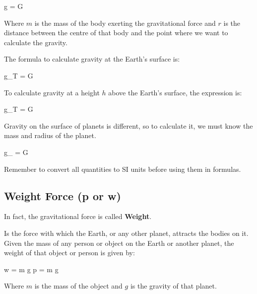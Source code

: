\begin{centeredequation}
    g = G \cdot {}
\end{centeredequation}

Where \( m \) is the mass of the body exerting the gravitational force and \( r \) is the distance between the centre of that body and the point where we want to calculate the gravity.

The formula to calculate gravity at the Earth's surface is:

\begin{centeredequation}
    g_T = G \cdot {}
\end{centeredequation}

To calculate gravity at a height \( h \) above the Earth's surface, the expression is:

\begin{centeredequation}
    g_T = G \cdot {}
\end{centeredequation}

\begin{remark}
    Gravity on the surface of planets is different, so to calculate it, we must know the mass and radius of the planet.
\end{remark}

\newpage

\begin{centeredequation}
    g_{} = G \cdot {}
\end{centeredequation}

\begin{remark}
    Remember to convert all quantities to SI units before using them in formulas.
\end{remark}

\subsection{Weight Force (p or w)}

In fact, the gravitational force is called \textbf{Weight}.

\begin{definition}
    Is the force with which the Earth, or any other planet, attracts the bodies on it.
    Given the mass of any person or object on the Earth or another planet, the weight of that object or person is given by:
    \begin{centeredequation}
        w = m \cdot g \quad {} \quad p = m \cdot g
    \end{centeredequation}
    Where \( m \) is the mass of the object and \( g \) is the gravity of that planet.
\end{definition}

